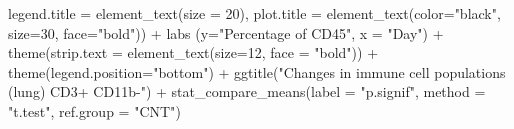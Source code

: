 \documentclass[
]{book}
\newenvironment{Shaded}{\begin{snugshade}}{\end{snugshade}}
\newcommand{\AttributeTok}[1]{\textcolor[rgb]{0.77,0.63,0.00}{#1}}
\newcommand{\DecValTok}[1]{\textcolor[rgb]{0.00,0.00,0.81}{#1}}
\newcommand{\FunctionTok}[1]{\textcolor[rgb]{0.00,0.00,0.00}{#1}}
\newcommand{\NormalTok}[1]{#1}
\newcommand{\SpecialCharTok}[1]{\textcolor[rgb]{0.00,0.00,0.00}{#1}}
\newcommand{\StringTok}[1]{\textcolor[rgb]{0.31,0.60,0.02}{#1}}
\begin{document}
\begin{Shaded}
\begin{Highlighting}[]
        \AttributeTok{legend.title =} \FunctionTok{element\_text}\NormalTok{(}\AttributeTok{size =} \DecValTok{20}\NormalTok{), }
        \AttributeTok{plot.title =} \FunctionTok{element\_text}\NormalTok{(}\AttributeTok{color=}\StringTok{"black"}\NormalTok{, }\AttributeTok{size=}\DecValTok{30}\NormalTok{, }\AttributeTok{face=}\StringTok{"bold"}\NormalTok{)) }\SpecialCharTok{+} 
  \FunctionTok{labs}\NormalTok{ (}\AttributeTok{y=}\StringTok{"Percentage of CD45"}\NormalTok{, }\AttributeTok{x =} \StringTok{"Day"}\NormalTok{) }\SpecialCharTok{+} 
  \FunctionTok{theme}\NormalTok{(}\AttributeTok{strip.text =} \FunctionTok{element\_text}\NormalTok{(}\AttributeTok{size=}\DecValTok{12}\NormalTok{, }\AttributeTok{face =} \StringTok{"bold"}\NormalTok{)) }\SpecialCharTok{+} \FunctionTok{theme}\NormalTok{(}\AttributeTok{legend.position=}\StringTok{"bottom"}\NormalTok{) }\SpecialCharTok{+}
  \FunctionTok{ggtitle}\NormalTok{(}\StringTok{"Changes in immune cell populations (lung) CD3+ CD11b{-}"}\NormalTok{) }\SpecialCharTok{+}
  \FunctionTok{stat\_compare\_means}\NormalTok{(}\AttributeTok{label =} \StringTok{"p.signif"}\NormalTok{, }\AttributeTok{method =} \StringTok{"t.test"}\NormalTok{,}
                     \AttributeTok{ref.group =} \StringTok{"CNT"}\NormalTok{)}




\end{Highlighting}
\end{Shaded}
\end{document}
